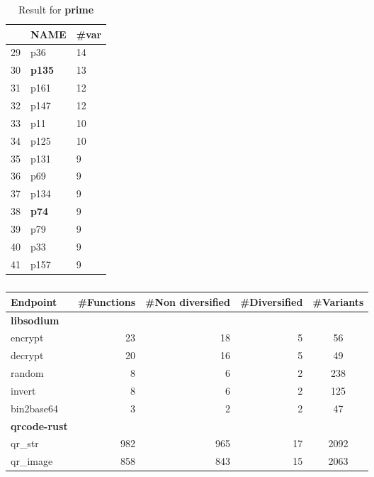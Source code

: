 \begin{table*}
\begin{tabular}[t]{l | l l}
    \midrule
    & NAME & \#var  \\
    \hline
    29 & p36 & 14 \\
    \hline
    30 & \textbf{p135} & 13  \\
    \hline
    31 & p161 & 12 \\
    \hline
    32 & p147 & 12 \\
    \hline
    33 & p11 & 10  \\
    \hline
    34 & p125 & 10  \\
    \hline
    35 & p131 & 9 \\
    \hline
    36 & p69 & 9 \\
    \hline
    37 & p134 & 9 \\
    \hline
    38 & \textbf{p74} & 9  \\
    \hline
    39 & p79 & 9 \\
    \hline
    40 & p33 & 9  \\
    \hline
    41 & p157 & 9 \\
    \hline
    \end{tabular}
    \caption{Result for \textbf{prime}}
    \label{tables:rq2:dynamic}
    \end{table*}
    

    {
\begin{table*}
\centering
\begin{tabular}{  p{2.6cm} | r r r c  }
    \hline
    Endpoint & \#Functions & \#Non diversified & \#Diversified & \#Variants \\
    \midrule

    
    \textbf{libsodium} & & & & \\
    \hline
        
    encrypt & 23  & 18 & 5 & 56 \\

    decrypt & 20  & 16 & 5 & 49   \\

    random & 8  & 6 & 2  & 238  \\

    invert & 8  & 6 & 2 & 125  \\

    bin2base64 & 3 & 2 & 2 & 47   \\

    \hline
    \textbf{qrcode-rust}  & & & & \\
    \hline
    qr\_str &  982  & 965 & 17 & 2092   \\
    qr\_image & 858  & 843  & 15 & 2063    \\
    \hline


\end{tabular}

\caption{}\label{table:CFG1}
\end{table*}
}
